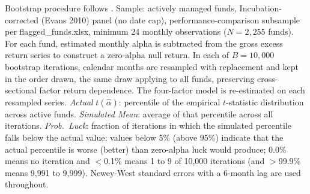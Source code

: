 \begin{table}[!htbp]
\centering
{}
\setlength{\tabletempwidth}{\wd\tabletempbox}
\ifdim\tabletempwidth>\linewidth\setlength{\tabletempwidth}{\linewidth}\fi
\begin{minipage}{\tabletempwidth}
\captionsetup{width=\linewidth}
\caption{\label{tab:bootstrap_tails}Fama--French (2010) Bootstrap: Actual vs.\ Simulated $t(\hat{\alpha})$ Percentiles}
\ifdim\wd\tabletempbox>\linewidth
  \resizebox{\linewidth}{!}{\usebox{\tabletempbox}}
\else
  \usebox{\tabletempbox}
\fi
\par\medskip
\begin{singlespace}\footnotesize\noindent
Bootstrap procedure follows \textcite{FamaFrench2010}. Sample: actively managed funds, Incubation-corrected (Evans 2010) panel (no date cap), performance-comparison subsample per flagged\_funds.xlsx, minimum 24 monthly observations ($N = 2{,}255$ funds). For each fund, estimated monthly alpha is subtracted from the gross excess return series to construct a zero-alpha null return. In each of $B = 10{,}000$ bootstrap iterations, calendar months are resampled with replacement and kept in the order drawn, the same draw applying to all funds, preserving cross-sectional factor return dependence. The \textcite{Carhart1997} four-factor model is re-estimated on each resampled series. \textit{Actual} $t(\hat{\alpha})$: percentile of the empirical $t$-statistic distribution across active funds. \textit{Simulated Mean}: average of that percentile across all iterations. \textit{Prob.\ Luck}: fraction of iterations in which the simulated percentile falls below the actual value; values below 5\% (above 95\%) indicate that the actual percentile is worse (better) than zero-alpha luck would produce; 0.0\% means no iteration and $<$0.1\% means 1 to 9 of 10,000 iterations (and $>$99.9\% means 9,991 to 9,999). Newey-West standard errors with a 6-month lag are used throughout.
\end{singlespace}
\end{minipage}
\end{table}

